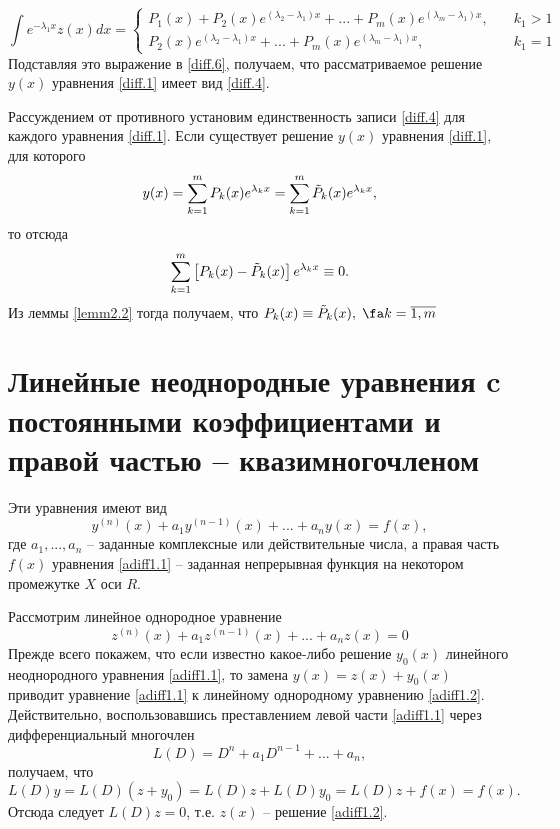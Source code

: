 $$
\int e^{-\lambda_1x}z(x)dx = \begin{cases}
P_1(x)+P_2(x)e^{(\lambda_2-\lambda_1)x}+...+P_m(x)e^{(\lambda_m-\lambda_1)x},\quad &k_1>1\\
P_2(x)e^{(\lambda_2-\lambda_1)x}+...+P_m(x)e^{(\lambda_m-\lambda_1)x},\quad &k_1=1
\end{cases}
$$
Подставляя это выражение в \eqref{diff.6}, получаем, что рассматриваемое решение $y(x)$ уравнения \eqref{diff.1} имеет вид \eqref{diff.4}.

Рассуждением от противного установим единственность записи \eqref{diff.4} для каждого уравнения \eqref{diff.1}. Если существует решение $y(x)$ уравнения \eqref{diff.1}, для которого
$$
y(x)=\sum_{k=1}^{m}\limits P_k(x)e^{\lambda_kx}=\sum_{k=1}^{m}\limits \tilde{P}_k(x)e^{\lambda_kx},
$$
то отсюда
$$
\sum_{k=1}^{m}\limits\left[P_k(x)-\tilde{P}_k(x)\right]e^{\lambda_kx}\equiv 0.
$$
Из леммы \ref{lemm2.2} тогда получаем, что $P_k(x)\equiv\tilde{P}_k(x),\; \fa k= \overline{1,m}$

\section{Линейные неоднородные уравнения c постоянными коэффициентами и правой частью -- квазимногочленом}
Эти уравнения имеют вид
\begin{equation} \label{adiff1.1}
y^{(n)}(x)+a_1y^{(n-1)}(x)+...+a_ny(x)=f(x),
\end{equation}
где $a_1,...,a_n$ -- заданные комплексные или действительные числа, а правая часть $f(x)$ уравнения \eqref{adiff1.1} -- заданная непрерывная функция на некотором промежутке $X$ оси $R$.

Рассмотрим линейное однородное уравнение
\begin{equation}\label{adiff1.2}
z^{(n)}(x)+a_1z^{(n-1)}(x)+...+a_nz(x)=0
\end{equation}
Прежде всего покажем, что если известно какое-либо решение $y_0(x)$ линейного неоднородного уравнения \eqref{adiff1.1}, то замена $y(x)=z(x)+y_0(x)$ приводит уравнение \eqref{adiff1.1} к линейному однородному уравнению \eqref{adiff1.2}. Действительно, воспользовавшись преставлением левой части \eqref{adiff1.1} через дифференциальный многочлен
\begin{equation}\label{adiff1.3}
L(D)=D^n+a_1D^{n-1}+...+a_n,
\end{equation}
получаем, что
$$
L(D)y=L(D)(z+y_0)=L(D)z+L(D)y_0=L(D)z+f(x)=f(x).
$$
Отсюда следует $L(D)z=0$, т.е. $z(x)$ -- решение \eqref{adiff1.2}.

